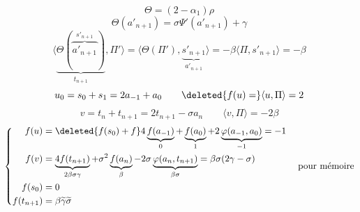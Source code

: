 \[
\Theta=(2-\alpha_1)\rho
\]
\deleted{\(\unsure{\Theta}\)}
\[
\Theta(a'_{n+1})=\sigma\Psi'(a'_{n+1})+\gamma
\]
\[
\langle\underbrace{\Theta(\overbrace{a'_{n+1}}^{s'_{n+1}})}_{t_{n+1}},\Pi'\rangle
=\langle\Theta(\Pi'),\underset{a'_{n+1}}{\underbrace{s'_{n+1}}}\rangle
=-\beta\langle\Pi,s'_{n+1}\rangle=-\beta
\]
\[
u_0=s_0+s_1=2a_{-1}+a_0
\qquad\deleted{f(u)=}\langle u,\Pi\rangle=2
\]
\[
v=t_n+t_{n+1}=2t_{n+1}-\sigma a_n
\qquad\langle v,\Pi\rangle=-2\beta
\]
\[
\left\{\begin{aligned}
f(u)&=\deleted{f(s_0)+f}
4\underbrace{f(a_{-1})}_0+\underbrace{f(a_0)}_1+
2\underbrace{\varphi(a_{-1},a_0)}_{-1}=-1\\
f(v)&=\underbrace{4f(t_{n+1})}_{2\beta\sigma\gamma}
+\sigma^2\underbrace{f(a_n)}_\beta
-2\sigma\underbrace{\varphi(a_n,t_{n+1})}_{\beta\sigma}
=\beta\sigma(2\gamma-\sigma)\\
f(s_0)&=0\\
f(t_{n+1})&=\beta\widetilde\gamma\widetilde\sigma
\end{aligned}\right.
\quad\text{pour mémoire}
\]

